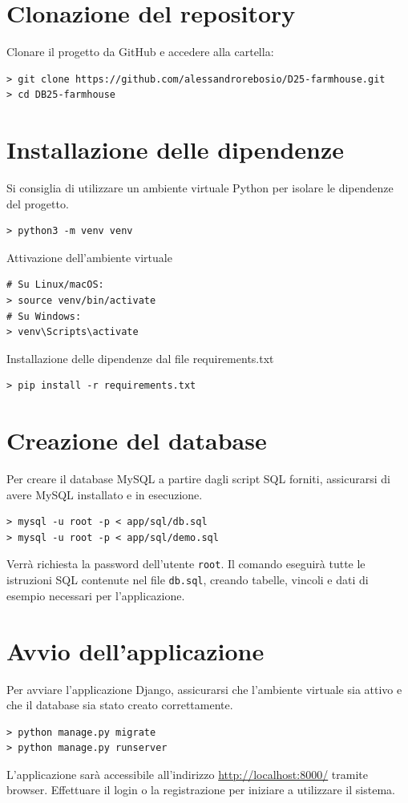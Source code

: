 \documentclass[a4paper,12pt]{report}
\begin{document}
\section{Clonazione del repository}
Clonare il progetto da GitHub e accedere alla cartella:

\begin{verbatim}
> git clone https://github.com/alessandrorebosio/D25-farmhouse.git
> cd DB25-farmhouse
\end{verbatim}

\section{Installazione delle dipendenze}

Si consiglia di utilizzare un ambiente virtuale Python per isolare le dipendenze del progetto.

\begin{verbatim}
> python3 -m venv venv
\end{verbatim}

\noindent Attivazione dell'ambiente virtuale
\begin{verbatim}
# Su Linux/macOS:
> source venv/bin/activate
# Su Windows:
> venv\Scripts\activate
\end{verbatim}

\noindent Installazione delle dipendenze dal file requirements.txt
\begin{verbatim}
> pip install -r requirements.txt
\end{verbatim}

\section{Creazione del database}

Per creare il database MySQL a partire dagli script SQL forniti, assicurarsi di avere MySQL
installato e in esecuzione.

\begin{verbatim}
> mysql -u root -p < app/sql/db.sql
> mysql -u root -p < app/sql/demo.sql
\end{verbatim}

Verrà richiesta la password dell'utente \texttt{root}. Il comando eseguirà tutte le
istruzioni SQL contenute nel file \texttt{db.sql}, creando tabelle, vincoli e dati di
esempio necessari per l'applicazione.

\section{Avvio dell'applicazione}

Per avviare l'applicazione Django, assicurarsi che l'ambiente virtuale sia attivo e che il database
sia stato creato correttamente.

\begin{verbatim}
> python manage.py migrate
> python manage.py runserver
\end{verbatim}

L'applicazione sarà accessibile all'indirizzo \url{http://localhost:8000/} tramite browser. Effettuare
il login o la registrazione per iniziare a utilizzare il sistema.
\end{document}
